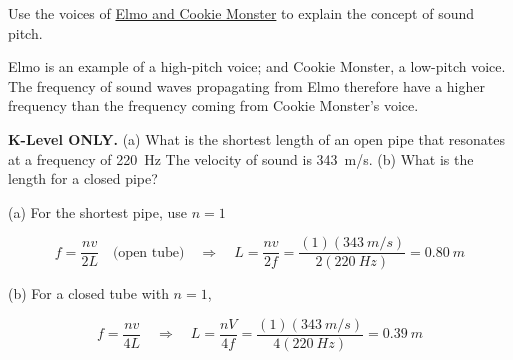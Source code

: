 \documentclass[]{exam}
\begin{document}
\begin{questions}
\question
Use the voices of \href{https://youtu.be/DgG6tXHru8c?si=Jcyk5kerVd4VnxNU}{Elmo and Cookie Monster} to explain the concept of sound pitch.

\ifprintanswers
{\color{red}
Elmo is an example of a high-pitch voice; and Cookie Monster, a low-pitch voice. The frequency of sound waves propagating from Elmo therefore have a higher frequency than the frequency coming from Cookie Monster's voice.
}
\fi

\fillwithlines{2cm}

\question
\textbf{K-Level ONLY.} (a) What is the shortest length of an open pipe that resonates at a frequency of \SI{220}{Hz} The velocity of sound is \SI{343}{m/s}. (b) What is the length for a closed pipe?

\begin{solutionorbox}[4cm]

(a) For the shortest pipe, use $n=1$

\begin{equation*}
    f = \frac{nv}{2L} \quad \text{(open tube)} \quad \Rightarrow \quad 
    L = \frac{nv}{2f} = \frac{(1)(\SI{343}{m/s})}{2(\SI{220}{Hz})} = \boxed{\SI{0.80}{m}}
\end{equation*}

(b) For a closed tube with $n = 1$,

\begin{equation*}
    f = \frac{nv}{4L} \quad \Rightarrow \quad 
    L = \frac{nV}{4f} = \frac{(1)(\SI{343}{m/s})}{4(\SI{220}{Hz})} = \boxed{\SI{0.39}{m}}
\end{equation*}
\end{solutionorbox}












\end{questions}
\end{document}
